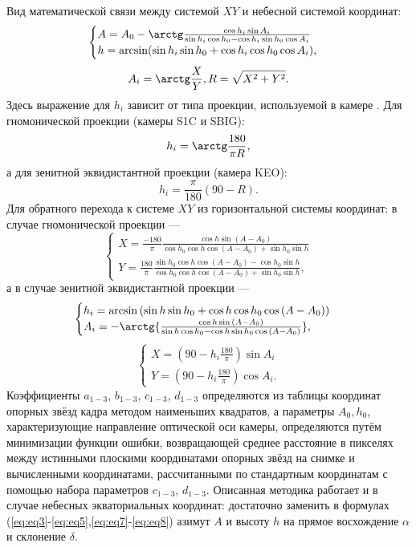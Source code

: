 \documentclass[12pt,a4paper]{article}
\begin{document}
Вид математической связи между системой $XY$ и небесной системой координат:
\begin{equation}\label{eq:eq3}
\begin{cases}
A = A_0 - \arctg\frac{\cos h_i\sin A_i}{\sin h_i \cos h_0 -\cos h_i \sin h_0 \cos A_i}\\
h = \arcsin (\sin h_i \sin h_0 + \cos h_i \cos h_0 \cos A_i),
\end{cases}
\end{equation}
\begin{equation}\label{eq:eq5}
A_i = \arctg\frac{X}{Y}, R = \sqrt{X^2 + Y^2}.
\end{equation} 
Здесь выражение для $h_i$ зависит от типа проекции, используемой в камере \cite{Calabretta2002}. Для гномонической проекции (камеры S1C и SBIG): 
\begin{equation}\label{eq:eq7}
h_i = \arctg\frac{180}{\pi R},
\end{equation}
 а для зенитной эквидистантной проекции (камера KEO): 
\begin{equation}\label{eq:eq8}
h_i = \frac{\pi}{180}(90-R).
\end{equation}
Для обратного перехода к системе $XY$ из горизонтальной системы координат: в случае гномонической проекции ---
\begin{equation}\label{eq:eq8_dop}
\begin{cases}
X=\frac{-180}{\pi}\frac{\cos{h}\sin{(A-A_0)}}{\cos{h_0}\cos{h}\cos{(A-A_0)}+\sin{h_0}\sin{h}}\\
Y=\frac{180}{\pi}
\frac{\sin{h_0}\cos{h}\cos{(A-A_0)}-\cos{h_0}\sin{h}}
{\cos{h_0}\cos{h}\cos{(A-A_0)}+\sin{h_0}\sin{h}},
\end{cases}
\end{equation}
а в случае зенитной эквидистантной проекции ---
\begin{equation}\label{eq:eq9_dop}
\begin{cases}
h_i=\arcsin{(\sin{h}\sin{h_0}+\cos{h}\cos{h_0}\cos{(A-A_0)})}\\
A_i=-\arctg{\frac
	{\cos{h}\sin{(A-A_0)}}
	{\sin{h}\cos{h_0}-\cos{h}\sin{h_0}\cos{(A-A_0)}}},
\end{cases}
\end{equation}
\begin{equation}\label{eq:eq10_dop}
\begin{cases}
X= (90-h_i\frac{180}{\pi})\sin{A_i}\\
Y= (90-h_i\frac{180}{\pi})\cos{A_i}.
\end{cases}
\end{equation}
Коэффициенты $a_{1-3}$, $b_{1-3}$, $c_{1-3}$, $d_{1-3}$ определяются из таблицы координат опорных звёзд кадра методом наименьших квадратов, а параметры $A_0, h_0$, характеризующие направление оптической оси камеры, определяются путём минимизации функции ошибки, возвращающей среднее расстояние в пикселях между истинными плоскими координатами опорных звёзд на снимке и вычисленными координатами, рассчитанными по стандартным координатам с помощью набора параметров $c_{1-3}$, $d_{1-3}$.
Описанная методика работает и в случае небесных экваториальных координат: достаточно заменить в формулах (\ref{eq:eq3}-\ref{eq:eq5},\ref{eq:eq7}-\ref{eq:eq8}) азимут $A$ и высоту $h$ на прямое восхождение $\alpha$ и склонение $\delta$.
\end{document}
